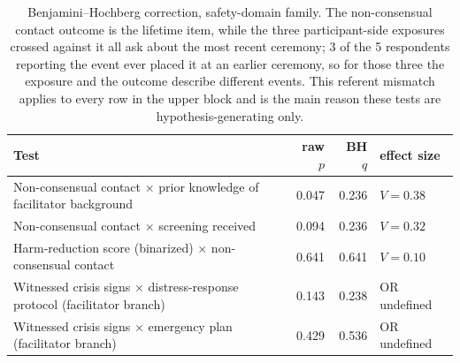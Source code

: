 \documentclass[12pt]{article}
\begin{document}
\begin{table}[htbp]
\centering
\caption{Benjamini--Hochberg correction, safety-domain family. The non-consensual contact outcome is the
lifetime item, while the three participant-side exposures crossed against it all ask about the most recent
ceremony; 3 of the 5 respondents reporting the event ever placed it at an earlier ceremony, so for those
three the exposure and the outcome describe different events. This referent mismatch applies to every row
in the upper block and is the main reason these tests are hypothesis-generating only.}
\begin{tabular}{p{8.2cm}rrl}
\toprule
Test & raw $p$ & BH $q$ & effect size \\
\midrule
Non-consensual contact $\times$ prior knowledge of facilitator background & 0.047 & 0.236 & $V=0.38$ \\
Non-consensual contact $\times$ screening received & 0.094 & 0.236 & $V=0.32$ \\
Harm-reduction score (binarized) $\times$ non-consensual contact & 0.641 & 0.641 & $V=0.10$ \\
\addlinespace
Witnessed crisis signs $\times$ distress-response protocol (facilitator branch) & 0.143 & 0.238 & OR undefined \\
Witnessed crisis signs $\times$ emergency plan (facilitator branch) & 0.429 & 0.536 & OR undefined \\
\bottomrule
\end{tabular}
\end{table}
\end{document}
